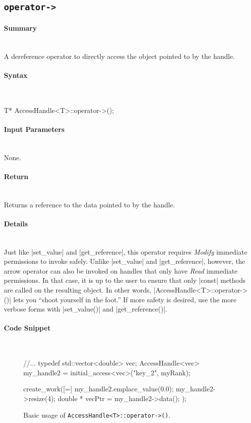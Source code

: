 \subsection{\texttt{operator->}}

\paragraph{Summary}\mbox{}\\
A dereference operator to directly access the object 
pointed to by the handle.

\paragraph{Syntax}\mbox{}\\
\begin{CppCode}
T* AccessHandle<T>::operator->();
\end{CppCode}

\paragraph{Input Parameters}\mbox{}\\
None.

\paragraph{Return}\mbox{}\\
Returns a reference to the data pointed to by the handle.

\paragraph{Details}\mbox{}\\
Just like |set_value| and |get_reference|, this operator
requires {\it Modify} immediate permissions to invoke safely.  Unlike 
|set_value| and |get_reference|, however, the arrow operator can
also be invoked on handles that only have {\it Read} immediate permissions.  In
that case, it is up to the user to ensure that only |const| methods are
called on the resulting object.  In other words,
|AccessHandle<T>::operator->()| lets you ``shoot yourself in the foot.''
If more safety is desired, use the more  verbose forms with
|set_value()| and |get_reference()|.


\paragraph{Code Snippet}\mbox{}\\
\begin{figure}[!h]
\begin{CppCodeNumb}
//...
typedef std::vector<double> vec;
AccessHandle<vec> my_handle2 = initial_access<vec>("key_2", myRank);

create_work([=]{
  my_handle2.emplace_value(0.0);
  my_handle2->resize(4);
  double * vecPtr = my_handle2->data();    
});
\end{CppCodeNumb}
\label{fig:fe_api_arrow}
\caption{Basic usage of \texttt{AccessHandle<T>::operator->()}.}
\end{figure}

